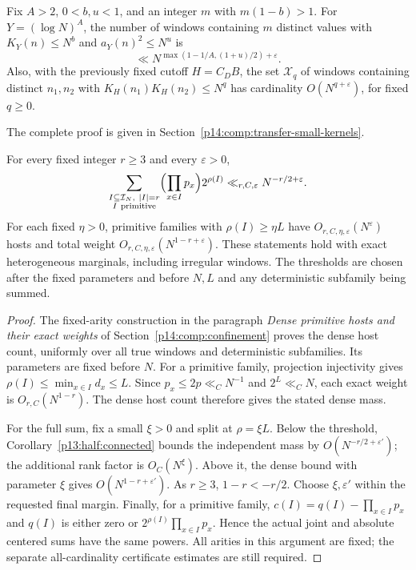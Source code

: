 \begin{lemma}
\label{p13:transfer:small-kernels}
Fix $A>2$, $0<b,u<1$, and an integer $m$ with $m(1-b)>1$.
For $Y=(\log N)^A$, the number of windows containing $m$ distinct
values with $K_Y(n)\leq N^b$ and $a_Y(n)^2\leq N^u$ is
\begin{equation}
 \ll N^{\max(1-1/A,(1+u)/2)+\varepsilon}.
 \label{p13:transfer:small-kernels-bound}
\end{equation}
Also, with the previously fixed cutoff $H=C_DB$, the set
$\mathcal X_q$ of windows containing distinct $n_1,n_2$
with $K_H(n_1)K_H(n_2)\leq N^q$ has cardinality
$O(N^{q+\varepsilon})$, for fixed $q\geq0$.
\end{lemma}

\noindent The complete proof is given in Section~\ref{p14:comp:transfer-small-kernels}.


\begin{proposition}
\label{p13:transfer:primitive}
For every fixed integer $r\ge3$ and every $\varepsilon>0$,
\begin{equation}
 \sum_{\substack{I\subseteq\mathcal I_N,\ |I|=r\\I\ \mathrm{primitive}}}
         \Bigl(\prod_{x\in I}p_x\Bigr)2^{\rho(I)}
       \ll_{r,C,\varepsilon}N^{-r/2+\varepsilon}.
 \label{p13:transfer:primitive-bound}
\end{equation}
For each fixed $\eta>0$, primitive families with $\rho(I)\ge\eta L$
have $O_{r,C,\eta,\varepsilon}(N^\varepsilon)$ hosts and total
weight $O_{r,C,\eta,\varepsilon}(N^{1-r+\varepsilon})$.
These statements hold with exact heterogeneous marginals, including
irregular windows. The thresholds are chosen after the fixed parameters
and before $N,L$ and any deterministic subfamily being summed.
\end{proposition}

\begin{proof}
The fixed-arity construction in the paragraph
\emph{Dense primitive hosts and their exact weights} of
Section~\ref{p14:comp:confinement} proves the dense host count,
uniformly over all true windows and deterministic subfamilies.
Its parameters are fixed before $N$.
For a primitive family, projection injectivity gives
$\rho(I)\le\min_{x\in I}d_x\le L$. Since $p_x\le2p\ll_C N^{-1}$
and $2^L\ll_C N$, each exact weight is $O_{r,C}(N^{1-r})$.
The dense host count therefore gives the stated dense mass.

For the full sum, fix a small $\xi>0$ and split at $\rho=\xi L$.
Below the threshold, Corollary~\ref{p13:half:connected} bounds
the independent mass by $O(N^{-r/2+\varepsilon'})$;
the additional rank factor is $O_C(N^\xi)$.
Above it, the dense bound with parameter $\xi$ gives
$O(N^{1-r+\varepsilon'})$. As $r\ge3$, $1-r<-r/2$.
Choose $\xi,\varepsilon'$ within the requested final margin.
Finally, for a primitive family,
$c(I)=q(I)-\prod_{x\in I}p_x$ and $q(I)$ is either zero or
$2^{\rho(I)}\prod_{x\in I}p_x$. Hence the actual joint and
absolute centered sums have the same powers.
All arities in this argument are fixed; the separate
all-cardinality certificate estimates are still required.
\end{proof}

